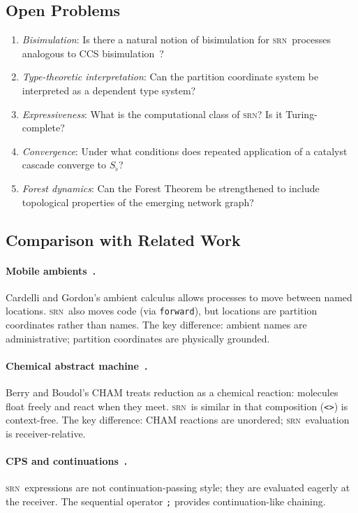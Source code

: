 \documentclass[twocolumn,11pt,a4paper]{article}
\theoremstyle{definition}
\theoremstyle{remark}
\newcommand{\srn}{\textsc{srn}}
\newcommand{\floor}{S_{\flat}}
\begin{document}
\subsection{Open Problems}

\begin{enumerate}[noitemsep,topsep=2pt]
\item \emph{Bisimulation}: Is there a natural notion of bisimulation
  for \srn\ processes analogous to CCS bisimulation~\cite{milner1989communication}?
\item \emph{Type-theoretic interpretation}: Can the partition coordinate
  system be interpreted as a dependent type system?
\item \emph{Expressiveness}: What is the computational class of \srn?
  Is it Turing-complete?
\item \emph{Convergence}: Under what conditions does repeated application
  of a catalyst cascade converge to $\floor$?
\item \emph{Forest dynamics}: Can the Forest Theorem be strengthened
  to include topological properties of the emerging network graph?
\end{enumerate}

\subsection{Comparison with Related Work}

\paragraph{Mobile ambients~\cite{cardelli2000mobile}.}
Cardelli and Gordon's ambient calculus allows processes to move between
named locations.  \srn\ also moves code (via \texttt{forward}), but
locations are partition coordinates rather than names.  The key
difference: ambient names are administrative; partition coordinates are
physically grounded.

\paragraph{Chemical abstract machine~\cite{berry1992chemical}.}
Berry and Boudol's CHAM treats reduction as a chemical reaction:
molecules float freely and react when they meet.  \srn\ is similar in
that composition (\lstinline|<>|) is context-free.  The key difference:
CHAM reactions are unordered; \srn\ evaluation is receiver-relative.

\paragraph{CPS and continuations~\cite{plotkin1975call}.}
\srn\ expressions are not continuation-passing style; they are
evaluated eagerly at the receiver.  The sequential operator \lstinline|;|
provides continuation-like chaining.
\end{document}
